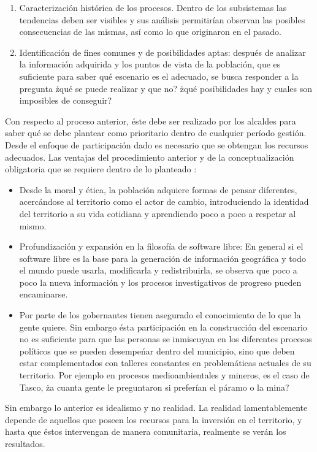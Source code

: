 \begin{multicols}{2}
\begin{enumerate}
\item Caracterización histórica de los procesos. Dentro de los subsistemas las tendencias deben ser visibles y sus análisis permitirían observan las posibles consecuencias de las mismas, así como lo que originaron en el pasado.
\item Identificación de fines comunes y de posibilidades aptas: después de analizar la información adquirida y los puntos de vista de la población, que es suficiente para saber qué escenario es el adecuado, se busca responder a la pregunta żqué se puede realizar y que no? żqué posibilidades hay y cuales son imposibles de conseguir? 
\end{enumerate}
Con respecto al proceso anterior, éste debe ser realizado por los alcaldes para saber qué se debe plantear como prioritario dentro de cualquier período gestión. Desde el enfoque de participación dado es necesario que se obtengan los recursos adecuados.
Las ventajas del procedimiento anterior y de la conceptualización obligatoria que se requiere dentro de lo planteado :
\begin{itemize}
 \item Desde la moral y ética, la población adquiere formas de pensar diferentes, acercándose al territorio como el actor de cambio, introduciendo la identidad del territorio a su vida cotidiana y aprendiendo poco a poco a respetar al mismo.
 \item Profundización y expansión en la filosofía de software libre: En general si el software libre es la base para la generación de información geográfica y todo el mundo  puede usarla, modificarla y redistribuirla, se observa que poco a poco la nueva información y los procesos investigativos de progreso pueden encaminarse.
 \item Por parte de los gobernantes tienen asegurado el conocimiento de lo que la gente quiere. Sin embargo ésta participación en la construcción del escenario no es suficiente para que las personas se inmiscuyan en los diferentes procesos políticos que se pueden desempeńar dentro del municipio, sino que deben estar complementados con talleres constantes en problemáticas actuales de su territorio. Por ejemplo en procesos medioambientales y mineros, es el caso de Tasco, ża cuanta gente le preguntaron si preferían el páramo o la mina?
\end{itemize}
Sin embargo lo anterior es idealismo y no realidad. La realidad lamentablemente depende de aquellos que poseen los recursos para la inversión en el territorio, y hasta que éstos intervengan de manera comunitaria, realmente se verán los resultados. 



\end{multicols}
